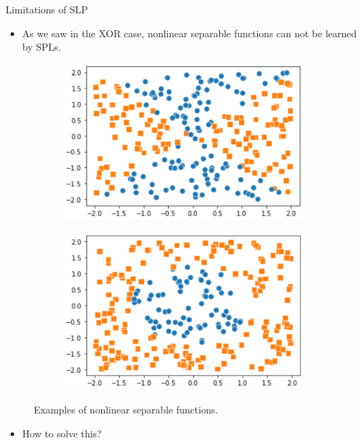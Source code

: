 \documentclass[compress,oilve,t]{beamer}
\begin{document}
\begin{frame}{Limitations of SLP}
	\begin{itemize}
		\item As we saw in the XOR case, nonlinear separable functions can not be learned by SPLs.
	\end{itemize}
	\begin{figure}[H]
		\centering
		\begin{subfigure}[b]{0.4\textwidth}
			\centering
			\includegraphics[width=\textwidth]{Figs/non-linear1.png}
		\end{subfigure}
		\hspace*{1.5em}
		\begin{subfigure}[b]{0.4\textwidth}
			\centering
			\includegraphics[width=\textwidth]{Figs/non-linear2.png}
		\end{subfigure}
		\caption{Examples of nonlinear separable functions.}
	\end{figure}    
	\begin{itemize}
		\item How to solve this?
	\end{itemize}
\end{frame}
\end{document}
